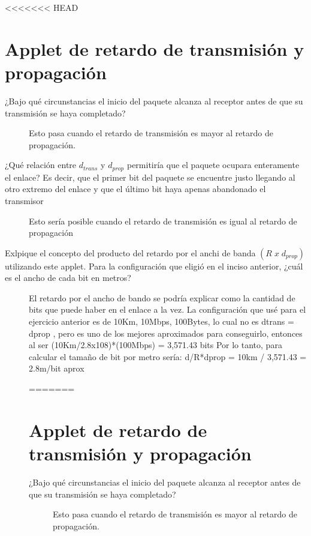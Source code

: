 <<<<<<< HEAD

\section*{Applet de retardo de transmisi\'on y propagaci\'on}

	\begin{description}
		\item[¿Bajo qué circunstancias el inicio del paquete alcanza al receptor antes de que su transmisi\'on se haya completado?] 
		Esto pasa cuando el retardo de transmisión es mayor al retardo de propagación.
		
		\item[¿Qu\'e relaci\'on entre $d_{trans}$ y $d_{prop}$ permitir\'ia que el paquete ocupara enteramente el enlace? Es decir, que el primer bit del paquete se encuentre justo llegando al otro extremo del enlace y que el \'ultimo bit haya apenas abandonado el transmisor]
		Esto sería posible cuando el retardo de transmisión es igual al retardo de propagación
		
		\item[Exlpique el concepto del producto del retardo por el anchi de banda $(R\;x\;d_{prop})$ utilizando este applet. Para la configuraci\'on que eligi\'o en el inciso anterior, ¿cu\'al es el ancho de cada bit en metros?]
		El retardo por el ancho de bando se podría explicar como la cantidad de bits que puede haber en el enlace a la vez. La configuración que usé para el ejercicio anterior es de 10Km, 10Mbps, 100Bytes, lo cual no es dtrans = dprop , pero es uno de los mejores aproximados para conseguirlo, entonces al ser (10Km/2.8x108)*(100Mbps) = 3,571.43 bits
		Por lo tanto, para calcular el tamaño de bit por metro sería: 
		d/R*dprop = 10km / 3,571.43 = 2.8m/bit aprox
		
=======

\section*{Applet de retardo de transmisi\'on y propagaci\'on}

	\begin{description}
		\item[¿Bajo qué circunstancias el inicio del paquete alcanza al receptor antes de que su transmisi\'on se haya completado?] 
		Esto pasa cuando el retardo de transmisión es mayor al retardo de propagación.
		

\end{description}
\end{description}
